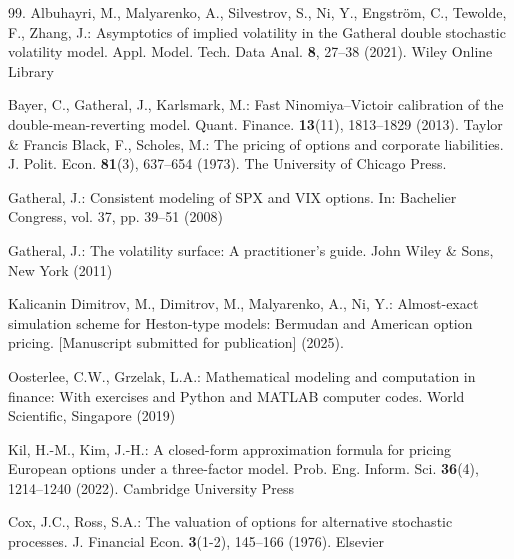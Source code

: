 %
%
% 
% 
%

\begin{thebibliography}{99.}%
 Albuhayri, M., Malyarenko, A., Silvestrov, S., Ni, Y., Engström, C., Tewolde, F., Zhang, J.: Asymptotics of implied volatility in the Gatheral double stochastic volatility model. Appl. Model. Tech. Data Anal. \textbf{8}, 27--38 (2021). Wiley Online Library

 Bayer, C., Gatheral, J., Karlsmark, M.: Fast Ninomiya--Victoir calibration of the double-mean-reverting model. Quant. Finance. \textbf{13}(11), 1813--1829 (2013). Taylor \& Francis
 Black, F., Scholes, M.: The pricing of options and corporate liabilities. J. Polit. Econ. \textbf{81}(3), 637--654 (1973). The University of Chicago Press.


 Gatheral, J.: Consistent modeling of SPX and VIX options. In: Bachelier Congress, vol. 37, pp. 39--51 (2008)

 Gatheral, J.: The volatility surface: A practitioner's guide. John Wiley \& Sons, New York (2011)



 Kalicanin Dimitrov, M., Dimitrov, M., Malyarenko, A., Ni, Y.: Almost-exact simulation scheme for Heston-type models: Bermudan and American option pricing. [Manuscript submitted for publication] (2025).



 Oosterlee, C.W., Grzelak, L.A.: Mathematical modeling and computation in finance: With exercises and Python and MATLAB computer codes. World Scientific, Singapore (2019)

 Kil, H.-M., Kim, J.-H.: A closed-form approximation formula for pricing European options under a three-factor model. Prob. Eng. Inform. Sci. \textbf{36}(4), 1214--1240 (2022). Cambridge University Press

 Cox, J.C., Ross, S.A.: The valuation of options for alternative stochastic processes. J. Financial Econ. \textbf{3}(1-2), 145--166 (1976). Elsevier


\end{thebibliography}
